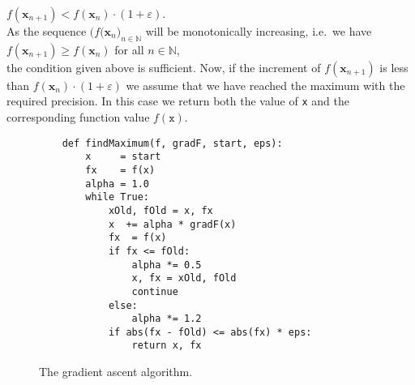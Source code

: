 \begin{enumerate}
      \hspace*{1.3cm}
      $f(\mathbf{x}_{n+1}) < f(\mathbf{x}_{n}) \cdot (1 + \varepsilon)$.
      \\[0.2cm]
      As the sequence $\bigl(f(\mathbf{x}_n\bigr)_{n\in\mathbb{N}}$ will be monotonically
      increasing, i.e.~we have
      \\[0.2cm]
      \hspace*{1.3cm}
      $f(\mathbf{x}_{n+1}) \geq f(\mathbf{x}_{n})$ \quad for all $n\in\mathbb{N}$,
      \\[0.2cm]
      the condition given above is sufficient.  Now, if the increment of  $f(\mathbf{x}_{n+1})$ is less than $f(\mathbf{x}_{n}) \cdot (1 + \varepsilon)$ 
      we assume that we have reached the maximum with the required precision.  In this case we return both the
      value of \texttt{x} and the corresponding function value $f(\mathtt{x})$.
\end{enumerate}

\begin{figure}[!ht]
\centering
\begin{verbatim}
    def findMaximum(f, gradF, start, eps):
        x     = start
        fx    = f(x)
        alpha = 1.0
        while True:
            xOld, fOld = x, fx
            x  += alpha * gradF(x)
            fx  = f(x)
            if fx <= fOld:   
                alpha *= 0.5
                x, fx = xOld, fOld
                continue
            else:
                alpha *= 1.2
            if abs(fx - fOld) <= abs(fx) * eps:
                return x, fx
\end{verbatim}

\caption{The gradient ascent algorithm.}
\label{fig:gradient-ascent.py}
\end{figure}
\FloatBarrier

